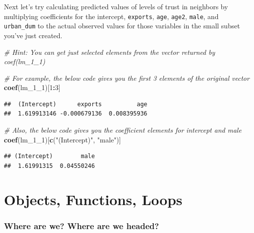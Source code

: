 \documentclass[
]{book}
\newenvironment{Shaded}{\begin{snugshade}}{\end{snugshade}}
\newcommand{\CommentTok}[1]{\textcolor[rgb]{0.56,0.35,0.01}{\textit{#1}}}
\newcommand{\DecValTok}[1]{\textcolor[rgb]{0.00,0.00,0.81}{#1}}
\newcommand{\KeywordTok}[1]{\textcolor[rgb]{0.13,0.29,0.53}{\textbf{#1}}}
\newcommand{\NormalTok}[1]{#1}
\newcommand{\OperatorTok}[1]{\textcolor[rgb]{0.81,0.36,0.00}{\textbf{#1}}}
\newcommand{\StringTok}[1]{\textcolor[rgb]{0.31,0.60,0.02}{#1}}
\theoremstyle{definition}
\theoremstyle{definition}
\theoremstyle{definition}
\theoremstyle{remark}
\begin{document}
Next let's try calculating predicted values of levels of trust in neighbors by multiplying coefficients for the intercept, \texttt{exports}, \texttt{age}, \texttt{age2}, \texttt{male}, and \texttt{urban\_dum} to the actual observed values for those variables in the small subset you've just created.

\begin{Shaded}
\begin{Highlighting}[]
\CommentTok{\# Hint: You can get just selected elements from the vector returned by coef(lm\_1\_1)}

\CommentTok{\# For example, the below code gives you the first 3 elements of the original vector}
\KeywordTok{coef}\NormalTok{(lm\_}\DecValTok{1}\NormalTok{\_}\DecValTok{1}\NormalTok{)[}\DecValTok{1}\OperatorTok{:}\DecValTok{3}\NormalTok{]}
\end{Highlighting}
\end{Shaded}

\begin{verbatim}
##  (Intercept)      exports          age 
##  1.619913146 -0.000679136  0.008395936
\end{verbatim}

\begin{Shaded}
\begin{Highlighting}[]
\CommentTok{\# Also, the below code gives you the coefficient elements for intercept and male}
\KeywordTok{coef}\NormalTok{(lm\_}\DecValTok{1}\NormalTok{\_}\DecValTok{1}\NormalTok{)[}\KeywordTok{c}\NormalTok{(}\StringTok{"(Intercept)"}\NormalTok{, }\StringTok{"male"}\NormalTok{)]}
\end{Highlighting}
\end{Shaded}

\begin{verbatim}
## (Intercept)        male 
##  1.61991315  0.04550246
\end{verbatim}

\hypertarget{robjloops}{%
\chapter{Objects, Functions, Loops}\label{robjloops}}

\hypertarget{where-are-we-where-are-we-headed-2}{%
\subsection*{Where are we? Where are we headed?}\label{where-are-we-where-are-we-headed-2}}
\end{document}
